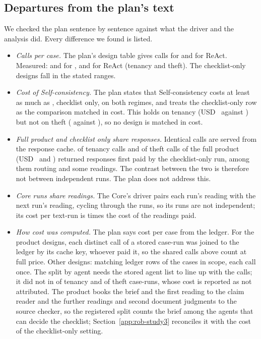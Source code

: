 \subsection{Departures from the plan's text}
We checked the plan sentence by sentence against what the driver and the analysis did. Every difference we found is listed.
\begin{itemize}[leftmargin=1.2em,itemsep=1pt]
\item \emph{Calls per case.} The plan's design table gives \sthreePlanCallsCasePath{} calls for \casepath and \sthreePlanCallsReact{} for ReAct. Measured: \sthreeCasePathTenCalls{} and \sthreeCasePathThCalls{} for \casepath, \sthreeReactTenCalls{} and \sthreeReactThCalls{} for ReAct (tenancy and theft). The checklist-only designs fall in the stated ranges.
\item \emph{Cost of Self-consistency.} The plan states that Self-consistency costs at least as much as \casepath, checklist only, on both regimes, and treats the checklist-only row as the comparison matched in cost. This holds on tenancy (USD~\sthreeSelfConsTenCostFour{} against \sthreeChecklistTenCostFour) but not on theft (\sthreeSelfConsThCostFour{} against \sthreeChecklistThCostFour), so no design is matched in cost.
\item \emph{Full product and checklist only share responses.} Identical calls are served from the response cache. \sthreeSharedTenCalls{} of \sthreeSharedTenAllCalls{} tenancy calls and \sthreeSharedThCalls{} of \sthreeSharedThAllCalls{} theft calls of the full product (USD~\sthreeSharedTenUSD{} and \sthreeSharedThUSD) returned responses first paid by the checklist-only run, among them routing and some readings. The contrast between the two is therefore not between independent runs. The plan does not address this.
\item \emph{Core runs share readings.} The Core's driver pairs each run's reading with the next run's reading, cycling through the runs, so its runs are not independent; its cost per text-run is \sthreeCoreMultiplier{} times the cost of the readings paid.
\item \emph{How cost was computed.} The plan says cost per case from the ledger. For the product designs, each distinct call of a stored case-run was joined to the ledger by its cache key, whoever paid it, so the shared calls above count at full price. Other designs: matching ledger rows of the cases in scope, each call once. The split by agent needs the stored agent list to line up with the calls; it did not in \sthreeCasePathTenNotLinedUp{} of \sthreeCasePathTenCaseRuns{} tenancy and \sthreeCasePathThNotLinedUp{} of \sthreeCasePathThCaseRuns{} theft case-runs, whose cost is reported as not attributed. The product books the brief and the first reading to the claim reader and the further readings and second document judgments to the source checker, so the registered split counts the brief among the agents that can decide the checklist; Section~\ref{app:rob-study3} reconciles it with the cost of the checklist-only setting.

\end{itemize}
